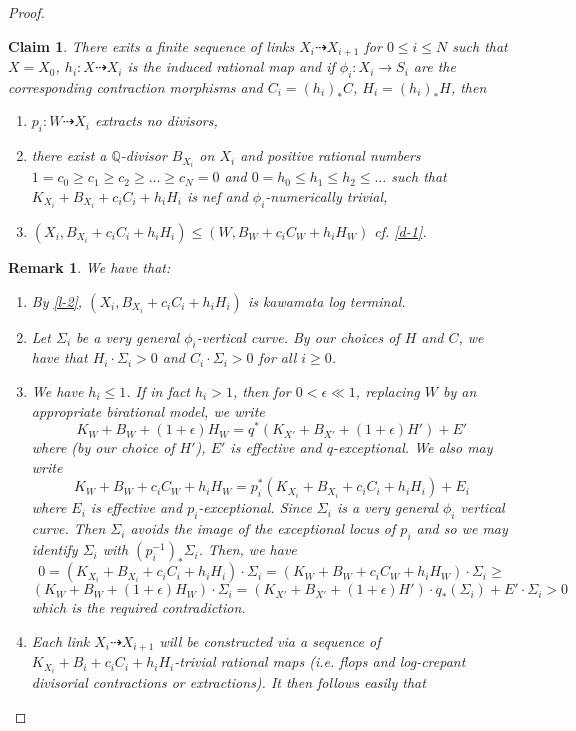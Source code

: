 \documentclass[12pt]{amsart}
\theoremstyle{plain}
\newtheorem{claim}[theorem]{Claim}
\newtheorem{remark}[theorem]{Remark}
\newcommand\Q{{\mathbb{Q}}}
\begin{document}
\begin{proof}
\begin{claim}\label{c-1} There exits a finite sequence of links $X_i\dasharrow X_{i+1}$
for $0\leq i\leq N$ such that $X=X_0$, $h_i:X\dasharrow X_i$ is the induced rational map and
if $\phi _i:X_i\to S_i$ are the corresponding 
contraction morphisms and $C_i=(h_i)_*C$, $H_i=(h_i)_*H$,
then\begin{enumerate}
\item $p_i:W\dasharrow X_i$ extracts no divisors,
\item there exist a $\Q$-divisor $B_{X_i}$ on $X_i$ and 
positive rational numbers $1=c_0\geq c_{1}\geq c_2\geq \ldots \geq c_N=0$ and 
$0=h_0\leq h_1\leq h_{2}\leq \ldots$
such that
$K_{X_i}+B_{X_i}+c_iC_i+h_iH_i$ is nef and $\phi _i$-numerically trivial,
\item $(X_i,B_{X_i}+c_iC_i+h_iH_i)\leq (W,B_{W}+c_iC_W+h_iH_W)$ cf. \eqref{d-1}.
\end{enumerate}
\end{claim}
\begin{remark}\label{r-1} We have that: \begin{enumerate}\item By \eqref{l-2}, $ (X_i,B_{X_i}+c_iC_i+h_iH_i)$
is kawamata log terminal.
\item Let $\Sigma _i$ be a very general $\phi _i$-vertical curve.
By our choices of $H$ and $C$, we have that 
$H_i\cdot \Sigma _i>0$ and $C_i\cdot \Sigma _i>0$ for all $i\geq 0$.
\item We have $h_i\leq 1$. If in fact $h_i>1$, then for $0<\epsilon \ll 1$, 
replacing $W$ by an appropriate birational model, we write 
$$K_W+B_W+(1+\epsilon)H_W=q^*(K_{X'}+B_{X'}+(1+\epsilon)H')+E'$$
where (by our choice of $H'$), $E'$ is effective and $q$-exceptional.
We also may write
$$K_W+B_W+c_iC_W+h_iH_W=p_i^*(K_{X_i}+B_{X_i}+c_iC_i+h_iH_i)+E_i$$ where $E_i$
is effective and $p_i$-exceptional.
Since $\Sigma _i$ is a very general $\phi _i$ vertical curve. Then $\Sigma _i$
avoids the image of the exceptional locus of $p_i$ and so we may identify 
$\Sigma _i$ with $(p_i^{-1})_*\Sigma _i$.
Then, we have 
$$0=(K_{X_i}+B_{X_i}+c_iC_i+h_iH_i)\cdot \Sigma _i=
(K_W+B_W+c_iC_W+h_iH_W)\cdot \Sigma _i\geq$$
$$(K_W+B_W+(1+\epsilon)H_W)\cdot \Sigma _i=(K_{X'}+B_{X'}+(1+\epsilon)H')\cdot q_*(\Sigma _i)+E' \cdot \Sigma _i>0$$
which is the required contradiction.
\item Each link $X_i\dasharrow X_{i+1}$
will be constructed via a sequence of $K_{X_i}+B_i+c_iC_i+h_iH_i$-trivial
rational maps (i.e. flops and log-crepant divisorial contractions or extractions). It then follows easily that

\end{enumerate}
\end{remark}
\end{proof}
\end{document}

